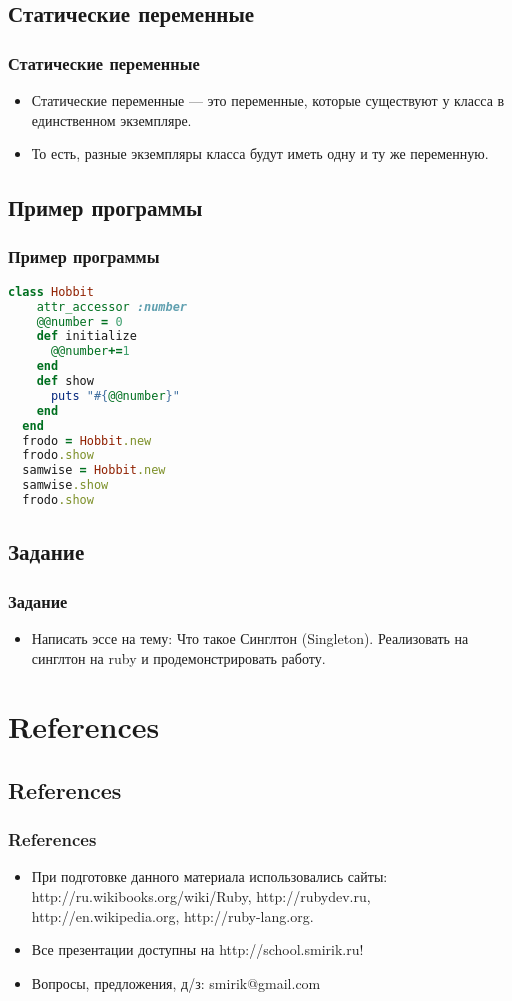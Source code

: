 \documentclass[compress,red]{beamer}
\begin{document}
\subsection{Статические переменные}
\begin{frame}[fragile]
  \frametitle{Статические переменные}
  \begin{itemize}
    \item Статические переменные --- это переменные, которые существуют у класса в единственном экземпляре.
    \item То есть, разные экземпляры класса будут иметь одну и ту же переменную.
  \end{itemize}
\end{frame}

\subsection{Пример программы}
\begin{frame}[fragile]
  \frametitle{Пример программы}
  \scriptsize{
  \begin{lstlisting}[language=ruby,basicstyle=\footnotesize,label=ruby7,caption=Статическое свойство]
  class Hobbit
    attr_accessor :number
    @@number = 0
    def initialize
      @@number+=1
    end
    def show
      puts "#{@@number}"
    end
  end
  frodo = Hobbit.new
  frodo.show
  samwise = Hobbit.new
  samwise.show
  frodo.show
  \end{lstlisting}
  }
\end{frame}

\subsection{Задание}
\begin{frame}[fragile]
  \frametitle{Задание}
  \begin{itemize}
    \item Написать эссе на тему: Что такое Синглтон (Singleton). Реализовать на синглтон на ruby и продемонстрировать работу.
  \end{itemize}
\end{frame}

\section{References}
\subsection{References}
\begin{frame}[fragile]
  \frametitle{References}
  \begin{itemize}
    \item При подготовке данного материала использовались сайты: http://ru.wikibooks.org/wiki/Ruby, http://rubydev.ru, http://en.wikipedia.org, http://ruby-lang.org.
    \item Все презентации доступны на http://school.smirik.ru!
    \item Вопросы, предложения, д/з: smirik@gmail.com
  \end{itemize}
\end{frame}
\end{document}
